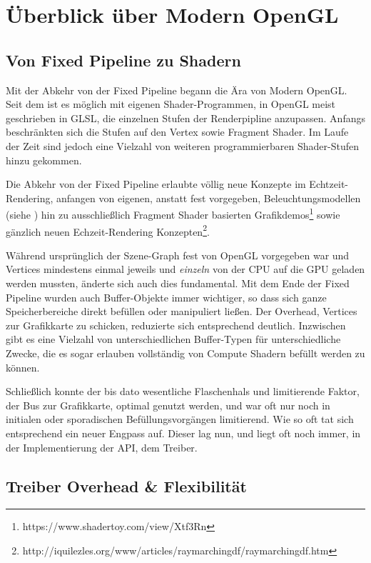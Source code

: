 \chapter{Überblick über Modern OpenGL}
\label{cha:modern-opengl}

\section{Von Fixed Pipeline zu Shadern}
Mit der Abkehr von der Fixed Pipeline begann die Ära von Modern OpenGL. Seit dem ist es möglich mit eigenen Shader-Programmen, in OpenGL meist geschrieben in GLSL, die einzelnen Stufen der Renderpipline anzupassen. Anfangs beschränkten sich die Stufen auf den Vertex sowie Fragment Shader. Im Laufe der Zeit sind jedoch eine Vielzahl von weiteren programmierbaren Shader-Stufen hinzu gekommen.

Die Abkehr von der Fixed Pipeline erlaubte völlig neue Konzepte im Echtzeit-Rendering, anfangen von eigenen, anstatt fest vorgegeben, Beleuchtungsmodellen (siehe ) hin zu ausschließlich Fragment Shader basierten Grafikdemos\footnote{https://www.shadertoy.com/view/Xtf3Rn} sowie gänzlich neuen Echzeit-Rendering Konzepten\footnote{http://iquilezles.org/www/articles/raymarchingdf/raymarchingdf.htm}.

Während ursprünglich der Szene-Graph fest von OpenGL vorgegeben war und Vertices mindestens einmal jeweils und \textit{einzeln} von der CPU auf die GPU geladen werden mussten, änderte sich auch dies fundamental. Mit dem Ende der Fixed Pipeline wurden auch Buffer-Objekte immer wichtiger, so dass sich ganze Speicherbereiche direkt befüllen oder manipuliert ließen. Der Overhead, Vertices zur Grafikkarte zu schicken, reduzierte sich entsprechend deutlich. Inzwischen gibt es eine Vielzahl von unterschiedlichen Buffer-Typen für unterschiedliche Zwecke, die es sogar erlauben vollständig von Compute Shadern befüllt werden zu können.

Schließlich konnte der bis dato wesentliche Flaschenhals und limitierende Faktor, der Bus zur Grafikkarte, optimal genutzt werden, und war oft nur noch in initialen oder sporadischen Befüllungsvorgängen limitierend. Wie so oft tat sich entsprechend ein neuer Engpass auf. Dieser lag nun, und liegt oft noch immer, in der Implementierung der API, dem Treiber.

\section{Treiber Overhead \& Flexibilität}

